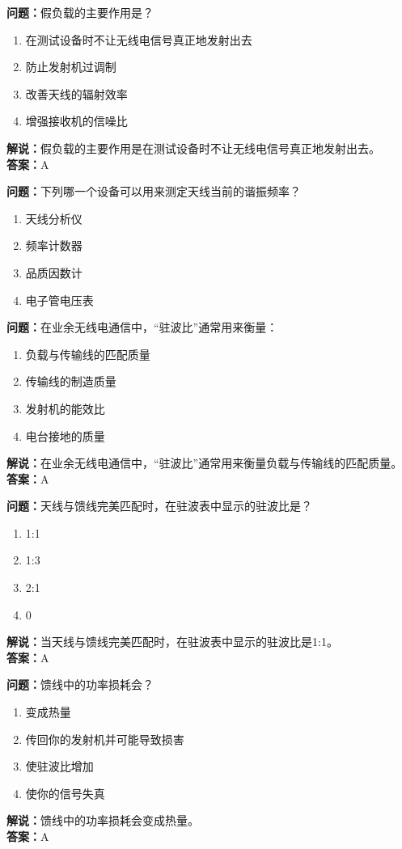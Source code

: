 \documentclass{ctexbook}%
\begin{document}
\textbf{问题：}假负载的主要作用是？
\begin{enumerate}[label=\Alph*), leftmargin=3em]
\item 在测试设备时不让无线电信号真正地发射出去
\item 防止发射机过调制
\item 改善天线的辐射效率
\item 增强接收机的信噪比
\end{enumerate}
\textbf{解说：}假负载的主要作用是在测试设备时不让无线电信号真正地发射出去。\\
\textbf{答案：}A

\textbf{问题：}下列哪一个设备可以用来测定天线当前的谐振频率？
\begin{enumerate}[label=\Alph*), leftmargin=3em]
\item 天线分析仪
\item 频率计数器
\item 品质因数计
\item 电子管电压表
\end{enumerate}

\textbf{问题：}在业余无线电通信中，“驻波比”通常用来衡量：
\begin{enumerate}[label=\Alph*), leftmargin=3em]
\item 负载与传输线的匹配质量
\item 传输线的制造质量
\item 发射机的能效比
\item 电台接地的质量
\end{enumerate}
\textbf{解说：}在业余无线电通信中，“驻波比”通常用来衡量负载与传输线的匹配质量。\\
\textbf{答案：}A

\textbf{问题：}天线与馈线完美匹配时，在驻波表中显示的驻波比是？
\begin{enumerate}[label=\Alph*), leftmargin=3em]
\item 1:1
\item 1:3
\item 2:1
\item 0
\end{enumerate}
\textbf{解说：}当天线与馈线完美匹配时，在驻波表中显示的驻波比是1:1。\\
\textbf{答案：}A

\textbf{问题：}馈线中的功率损耗会？
\begin{enumerate}[label=\Alph*), leftmargin=3em]
\item 变成热量
\item 传回你的发射机并可能导致损害
\item 使驻波比增加
\item 使你的信号失真
\end{enumerate}
\textbf{解说：}馈线中的功率损耗会变成热量。\\
\textbf{答案：}A
\end{document}
